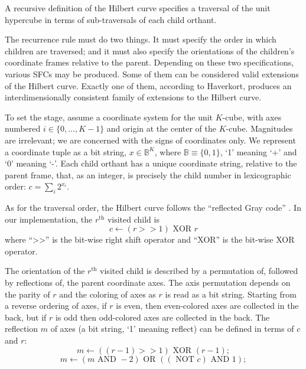 A recursive definition of the Hilbert curve specifies a traversal of the unit hypercube in terms of sub-traversals of each child orthant.

The recurrence rule must do two things. It must specify the order in which children are traversed; and it must also specify the orientations of the children's coordinate frames relative to the parent. Depending on these two specifications, various SFCs may be produced. Some of them can be considered valid extensions of the Hilbert curve. Exactly one of them, according to Haverkort, produces an interdimensionally consistent family of extensions to the Hilbert curve.

To set the stage, assume a coordinate system for the unit $K$-cube, with axes numbered $i \in \{0,\dots,K-1\}$ and origin at the center of the $K$-cube. Magnitudes are irrelevant; we are concerned with the signs of coordinates only. We represent a coordinate tuple as a bit string, $x \in \mathbb{B}^K$, where $\mathbb{B} \equiv \{0,1\}$, `1' meaning `+' and `0' meaning `-'. Each child orthant has a unique coordinate string, relative to the parent frame, that, as an integer, is precisely the child number in lexicographic order: $c = \sum_i 2^{x_i}$.

As for the traversal order, the Hilbert curve follows the ``reflected Gray code'' \cite{haverkort2012harmonious}. In our implementation, the $r^\text{th}$ visited child is
\begin{equation*}
  c \leftarrow (r >> 1) \textrm{ XOR } r
\end{equation*}
where ``>{}>'' is the bit-wise right shift operator and ``XOR'' is the bit-wise XOR operator.

The orientation of the $r^\text{th}$ visited child is described by a permutation of, followed by reflections of, the parent coordinate axes. The axis permutation depends on the parity of $r$ and the coloring of axes as $r$ is read as a bit string. Starting from a reverse ordering of axes, if $r$ is even, then even-colored axes are collected in the back, but if $r$ is odd then odd-colored axes are collected in the back. The reflection $m$ of axes (a bit string, `1' meaning reflect) can be defined in terms of $c$ and $r$:
\begin{equation*}
  m \leftarrow ((r-1) >> 1) \textrm{ XOR } (r-1);
\end{equation*}
\begin{equation*}
  m \leftarrow (m \textrm{ AND } -2) \textrm{ OR } ((\textrm{ NOT } c) \textrm{ AND } 1);
\end{equation*}

